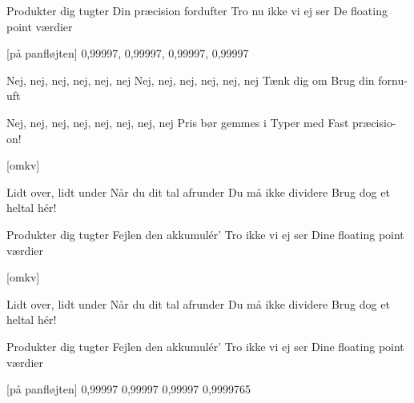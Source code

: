 \documentclass[a4paper,11pt]{article}
\begin{document}
\begin{song}
{        Produkter dig tugter
        Din præcision fordufter
        Tro nu ikke vi ej ser
        De floating point værdier
    }
    
    [på panfløjten] {
        0,99997, 0,99997, 0,99997, 0,99997 
    }

     {%
        Nej, nej, nej, nej, nej, nej
        Nej, nej, nej, nej, nej, nej
        Tænk dig om
        Brug din fornu-uft

        Nej, nej, nej, nej, nej, nej, nej, nej
        Pris bør gemmes i
        Typer med
        Fast præcisio-on!
    }

    [omkv] {
        Lidt over, lidt under
        Når du dit tal afrunder
        Du må ikke dividere
        Brug dog et heltal hér!

        Produkter dig tugter
        Fejlen den akkumulér'
        Tro ikke vi ej ser
        Dine floating point værdier
    }

    [omkv] {
        Lidt over, lidt under
        Når du dit tal afrunder
        Du må ikke dividere
        Brug dog et heltal hér!

        Produkter dig tugter
        Fejlen den akkumulér'
        Tro ikke vi ej ser
        Dine floating point værdier
    }

    [på panfløjten] {
        0,99997 
        0,99997 
        0,99997 
        0,9999765 
    }
\end{song}
\end{document}
